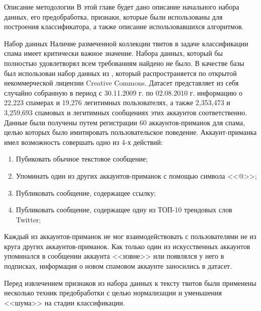 

\begin{section}{Описание методологии}
   В этой главе будет дано описание начального набора данных,
   его предобработка, признаки, которые были использованы для построения классификатора, а также описание использовавшихся алгоритмов.
  \begin{subsection}{Набор данных}
    \label{sec:dataset}
    Наличие размеченной коллекции твитов в задаче классификации
    спама имеет критически важное значение.
    Набора данных, который бы полностью удовлетворял всем требованиям найдено не было.
    В качестве базы был использован набор данных из \cite{Lee}, который распространяется
    по открытой некоммерческой лицензии Creative Commons.
    Датасет представляет из себя случайно собранную в период с 30.11.2009 г. по 02.08.2010 г. информацию
    о 22,223 спамерах и 19,276 легитимных пользователях, а также 2,353,473 и 3,259,693
    спамовых и легитимных сообщениях этих аккаунтов соответственно.
    Данные были получены путем регистрации 60 аккаунтов-приманок для спама, целью которых
    было имитировать пользовательское поведение.
    Аккаунт-приманка имел возможность совершать одно из 4-х действий:
    \begin{enumerate}
      \item Пубиковать обычное текстовое сообщение;
      \item Упоминать один из других аккаунтов-приманок с помощью символа <<@>>;
      \item Публиковать сообщение, содержащее ссылку;
      \item Публиковать сообщение, содержащее одну из ТОП-10 трендовых слов Twitter;
    \end{enumerate}

    Каждый из аккаунтов-приманок не мог взаимодействовать
    с пользователями не из круга других аккаунтов-приманок. Как только один из искусственных аккаунтов упоминался в сообщении аккаунта <<извне>> или появлялся у него в подписках, информация о новом спамовом аккаунте заносились в датасет.

    Перед извлечением признаков из набора данных к тексту твитов были применены несколько техник предобработки с целью нормализации и уменьшения <<шума>> на стадии классификации.

  \end{subsection}



\end{section}
